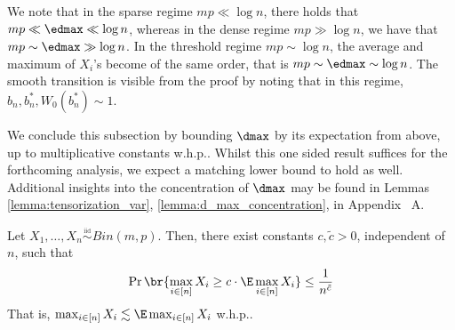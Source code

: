 \begin{remark}
We note that in the sparse regime \(mp \ll \log n\), there holds that \(mp \ll \edmax \ll \log n\), whereas in the dense regime \(mp \gg \log n\), we have that \(mp \sim \edmax \gg \log n\). In the threshold regime \(mp \sim \log n\), the average and maximum of $X_i$'s become of the same order, that is $mp \sim \edmax \sim \log n$. The smooth transition is visible from the proof by noting that in this regime, $b_n, b_n^*, W_0(b_n^*)\sim 1$. 
\end{remark}
\noindent
We conclude this subsection by bounding $\dmax$ by its expectation from above, up to multiplicative constants w.h.p.. Whilst this one sided result suffices for the forthcoming analysis, we expect a matching lower bound to hold as well. Additional insights into the concentration of $\dmax$ may be found in Lemmas  \ref{lemma:tensorization_var}, \ref{lemma:d_max_concentration}, in Appendix ~A.
\begin{lemma}
\label{lemma:d_max_concentration_whp}
    Let $X_1, \ldots, X_n  \overset{\underset{\mathrm{iid}}{}}{\sim} Bin(m,p)$. Then, there exist constants $c, \tilde{c} > 0$, independent of $n$, such that 
    \[\Pr \br{\max_{i \in [n]} X_i \geq c \cdot  \E \max_{i \in [n]}X_i} \leq \frac{1}{n^{\tilde{c}}}  \]
    That is, $\max_{i \in [n]}X_i \lesssim \E \max_{i \in [n]}X_i$ w.h.p..
\end{lemma}
